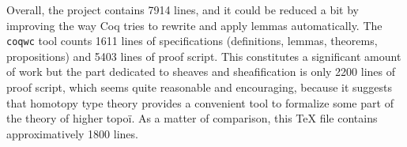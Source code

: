\documentclass[preprint,9pt,numbers]{sigplanconf}
\DeclareMathOperator{\HProp}{HProp}
\DeclareMathOperator{\IsHProp}{IsHProp}
\DeclareMathOperator{\id}{id}
\begin{document}

Overall, %
the project
contains 7914 lines, and it could be reduced a bit by improving the
way Coq tries to rewrite and apply lemmas automatically. 
The \texttt{coqwc} tool counts 1611 lines of specifications
(definitions, lemmas, theorems, propositions) and 5403 lines of proof
script.
%
This constitutes a significant amount of work but the part dedicated
to sheaves and sheafification is only 2200 lines of proof script,
which seems quite reasonable and encouraging, because it suggests
that homotopy type theory provides a convenient tool to formalize some
part of the theory of higher topoï. As a matter of comparison, this
\TeX\xspace file contains approximatively 1800 lines.

\end{document}
